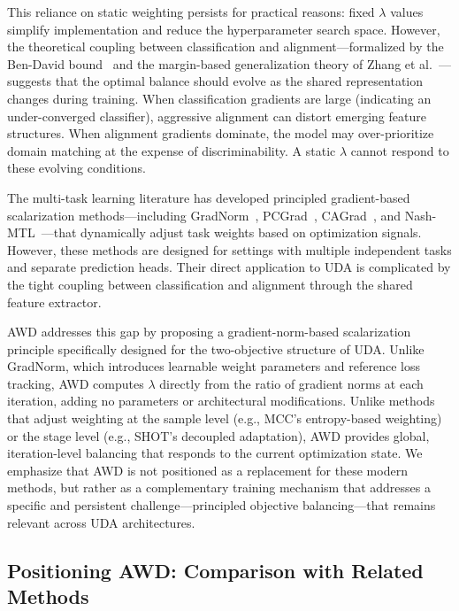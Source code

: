 \documentclass[pdflatex,sn-mathphys-num]{sn-jnl}
\theoremstyle{thmstyleone}
\theoremstyle{thmstyletwo}
\theoremstyle{thmstylethree}
\begin{document}
This reliance on static weighting persists for practical reasons: fixed $\lambda$ values simplify implementation and reduce the hyperparameter search space. However, the theoretical coupling between classification and alignment---formalized by the Ben-David bound~\cite{bendavid2010theory} and the margin-based generalization theory of Zhang et al.~\cite{zhang2019mdd}---suggests that the optimal balance should evolve as the shared representation changes during training. When classification gradients are large (indicating an under-converged classifier), aggressive alignment can distort emerging feature structures. When alignment gradients dominate, the model may over-prioritize domain matching at the expense of discriminability. A static $\lambda$ cannot respond to these evolving conditions.

The multi-task learning literature has developed principled gradient-based scalarization methods---including GradNorm~\cite{chen2018gradnorm}, PCGrad~\cite{yu2020pcgrad}, CAGrad~\cite{liu2021conflictaverse}, and Nash-MTL~\cite{navon2022nashmtl}---that dynamically adjust task weights based on optimization signals. However, these methods are designed for settings with multiple independent tasks and separate prediction heads. Their direct application to UDA is complicated by the tight coupling between classification and alignment through the shared feature extractor.

AWD addresses this gap by proposing a gradient-norm-based scalarization principle specifically designed for the two-objective structure of UDA. Unlike GradNorm, which introduces learnable weight parameters and reference loss tracking, AWD computes $\lambda$ directly from the ratio of gradient norms at each iteration, adding no parameters or architectural modifications. Unlike methods that adjust weighting at the sample level (e.g., MCC's entropy-based weighting) or the stage level (e.g., SHOT's decoupled adaptation), AWD provides global, iteration-level balancing that responds to the current optimization state. We emphasize that AWD is not positioned as a replacement for these modern methods, but rather as a complementary training mechanism that addresses a specific and persistent challenge---principled objective balancing---that remains relevant across UDA architectures.

\subsection{Positioning AWD: Comparison with Related Methods}
\end{document}
